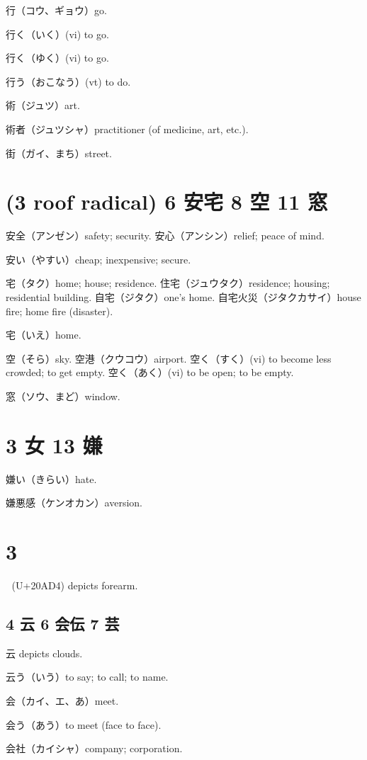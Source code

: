 行（コウ、ギョウ）go.

行く（いく）(vi) to go.

行く（ゆく）(vi) to go.

行う（おこなう）(vt) to do.

術（ジュツ）art.

術者（ジュツシャ）practitioner (of medicine, art, etc.).

街（ガイ、まち）street.

\section{(3 roof radical) 6 安宅 8 空 11 窓}

安全（アンゼン）safety; security.
安心（アンシン）relief; peace of mind.

安い（やすい）cheap; inexpensive; secure.

宅（タク）home; house; residence.
住宅（ジュウタク）residence; housing; residential building.
自宅（ジタク）one's home.
自宅火災（ジタクカサイ）house fire; home fire (disaster).

宅（いえ）home.

空（そら）sky.
空港（クウコウ）airport.
空く（すく）(vi) to become less crowded; to get empty.
空く（あく）(vi) to be open; to be empty.

窓（ソウ、まど）window.

\section{3 女 13 嫌}

嫌い（きらい）hate.

嫌悪感（ケンオカン）aversion.

\section{3 𠫔}

𠫔 (U+20AD4) depicts forearm.

\subsection{4 云 6 会伝 7 芸}

云 depicts clouds.

云う（いう）to say; to call; to name.

会（カイ、エ、あ）meet.

会う（あう）to meet (face to face).

会社（カイシャ）company; corporation.

